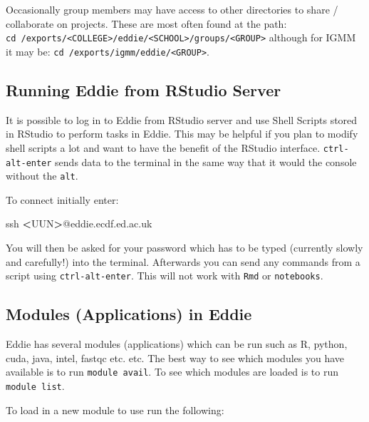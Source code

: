 \documentclass[
]{book}
\newenvironment{Shaded}{\begin{snugshade}}{\end{snugshade}}
\newcommand{\FunctionTok}[1]{\textcolor[rgb]{0.00,0.00,0.00}{#1}}
\newcommand{\NormalTok}[1]{#1}
\newcommand{\OperatorTok}[1]{\textcolor[rgb]{0.81,0.36,0.00}{\textbf{#1}}}
\begin{document}
Occasionally group members may have access to other directories to share / collaborate on projects. These are most often found at the path: \texttt{cd\ /exports/\textless{}COLLEGE\textgreater{}/eddie/\textless{}SCHOOL\textgreater{}/groups/\textless{}GROUP\textgreater{}} although for IGMM it may be: \texttt{cd\ /exports/igmm/eddie/\textless{}GROUP\textgreater{}}.

\hypertarget{running-eddie-from-rstudio-server}{%
\subsection{Running Eddie from RStudio Server}\label{running-eddie-from-rstudio-server}}

It is possible to log in to Eddie from RStudio server and use Shell Scripts stored in RStudio to perform tasks in Eddie. This may be helpful if you plan to modify shell scripts a lot and want to have the benefit of the RStudio interface. \texttt{ctrl-alt-enter} sends data to the terminal in the same way that it would the console without the \texttt{alt}.

To connect initially enter:

\begin{Shaded}
\begin{Highlighting}[]
\FunctionTok{ssh} \OperatorTok{<}\NormalTok{UUN}\OperatorTok{>}\NormalTok{@eddie.ecdf.ed.ac.uk}
\end{Highlighting}
\end{Shaded}

You will then be asked for your password which has to be typed (currently slowly and carefully!) into the terminal. Afterwards you can send any commands from a script using \texttt{ctrl-alt-enter}. This will not work with \texttt{Rmd} or \texttt{notebooks}.

\hypertarget{modules-applications-in-eddie}{%
\subsection{Modules (Applications) in Eddie}\label{modules-applications-in-eddie}}

Eddie has several modules (applications) which can be run such as R, python, cuda, java, intel, fastqc etc. etc. The best way to see which modules you have available is to run \texttt{module\ avail}. To see which modules are loaded is to run \texttt{module\ list}.

To load in a new module to use run the following:
\end{document}
